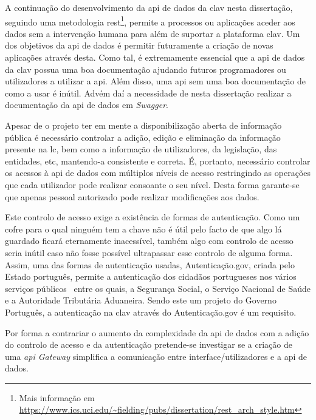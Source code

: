 A continuação do desenvolvimento da \acrshort{api} de dados da \acrshort{clav} nesta dissertação, seguindo uma metodologia \acrshort{rest}\footnote{Mais informação em \url{https://www.ics.uci.edu/~fielding/pubs/dissertation/rest_arch_style.htm}}, permite a processos ou aplicações aceder aos dados sem a intervenção humana para além de suportar a plataforma \acrshort{clav}. Um dos objetivos da \acrshort{api} de dados é permitir futuramente a criação de novas aplicações através desta. Como tal, é extremamente essencial que a \acrshort{api} de dados da \acrshort{clav} possua uma boa documentação ajudando futuros programadores ou utilizadores a utilizar a \acrshort{api}. Além disso, uma \acrshort{api} sem uma boa documentação de como a usar é inútil. Advém daí a necessidade de nesta dissertação realizar a documentação da \acrshort{api} de dados em \textit{Swagger}.

Apesar de o projeto ter em mente a disponibilização aberta de informação pública é necessário controlar a adição, edição e eliminação da informação presente na \acrlong{lc}, bem como a informação de utilizadores, da legislação, das entidades, etc, mantendo-a consistente e correta. É, portanto, necessário controlar os acessos à \acrshort{api} de dados com múltiplos níveis de acesso restringindo as operações que cada utilizador pode realizar consoante o seu nível. Desta forma garante-se que apenas pessoal autorizado pode realizar modificações aos dados.

Este controlo de acesso exige a existência de formas de autenticação. Como um cofre para o qual ninguém tem a chave não é útil pelo facto de que algo lá guardado ficará eternamente inacessível, também algo com controlo de acesso seria inútil caso não fosse possível ultrapassar esse controlo de alguma forma. Assim, uma das formas de autenticação usadas, Autenticação.gov, criada pelo Estado português, permite a autenticação dos cidadãos portugueses nos vários serviços públicos~\cite{authgov} entre os quais, a Segurança Social, o Serviço Nacional de Saúde e a Autoridade Tributária Aduaneira. Sendo este um projeto do Governo Português, a autenticação na \acrshort{clav} através do Autenticação.gov é um requisito.

Por forma a contrariar o aumento da complexidade da \acrshort{api} de dados com a adição do controlo de acesso e da autenticação pretende-se investigar se a criação de uma \textit{\acrshort{api} Gateway} simplifica a comunicação entre interface/utilizadores e a \acrshort{api} de dados.

